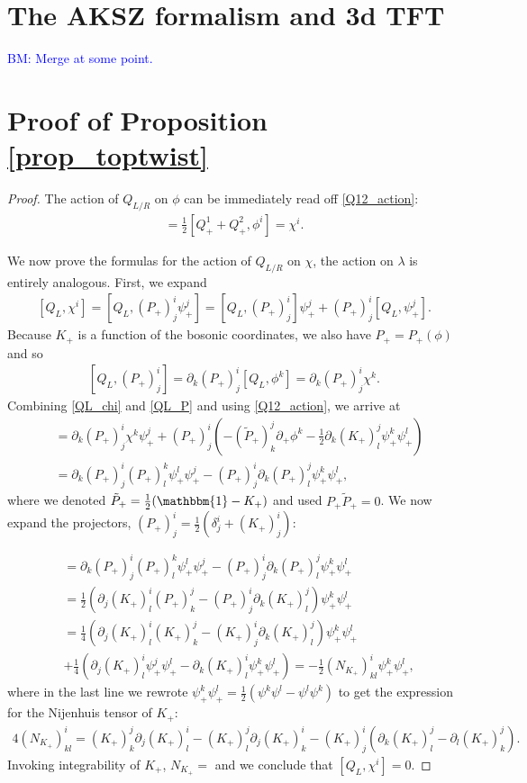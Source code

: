 \documentclass{article}
\newcommand{\id}{\mathbbm{1}}
\newcommand{\p}{\partial}
\def\tl{\tilde}
\theoremstyle{definition}
\theoremstyle{remark}
\def\brian{\textcolor{blue}{BM: }\textcolor{blue}}
\begin{document}
\section{The AKSZ formalism and 3d TFT}

\brian{Merge at some point.}

\appendix
\section{Proof of Proposition \ref{prop_toptwist}}\label{appendix:proof_prop}
\begin{proof}
The action of $Q_{L/R}$ on $\phi$ can be immediately read off \eqref{Q12_action}:
\begin{align}
[Q_L,\phi^i]=\frac{1}{2}[Q_+^1+Q^2_+,\phi^i]=\chi^i.
\end{align}

We now prove the formulas for the action of $Q_{L/R}$ on $\chi$, the action on $\lambda$ is entirely analogous. First, we expand
\begin{align}\label{QL_chi}
[Q_L,\chi^i]=[Q_L,(P_+)^i_j\psi_+^j]=[Q_L,(P_+)^i_j]\psi_+^j{+}(P_+)^i_j[Q_L,\psi_+^j].
\end{align}
Because $K_+$ is a function of the bosonic coordinates, we also have $P_+=P_+(\phi)$ and so
\begin{align}\label{QL_P}
[Q_L,(P_+)^i_j]=\p_k(P_+)^i_j[Q_L,\phi^k]=\p_k(P_+)^i_j\chi^k.
\end{align}
Combining \eqref{QL_chi} and \eqref{QL_P} and using \eqref{Q12_action}, we arrive at
\begin{align*}
[Q_L,\chi^i]&=\p_k(P_+)^i_j\chi^k\psi_+^j{+}(P_+)^i_j\left(-(\tl{P}_+)^j_k\p_+\phi^k{-}\frac{1}{2}\p_k(K_+)^j_l\psi_+^k\psi_+^l\right)\\
&=\p_k(P_+)^i_j(P_+)^k_l\psi_+^l\psi_+^j{-}(P_+)^i_j\p_k(P_+)^j_l\psi_+^k\psi_+^l,
\end{align*}
where we denoted $\tl{P}_+=\frac{1}{2}(\id-K_+)$ and used $P_+\tl{P}_+=0$. We now expand the projectors, $(P_+)^i_j=\frac{1}{2}(\delta^i_j+(K_+)^i_j)$:

\begin{align*}
[Q_L,\chi^i]&=\p_k(P_+)^i_j(P_+)^k_l\psi_+^l\psi_+^j{-}(P_+)^i_j\p_k(P_+)^j_l\psi_+^k\psi_+^l\\
&=\frac{1}{2}(\p_j(K_+)^i_l(P_+)^j_k{-}(P_+)^i_j\p_k(K_+)^j_l)\psi_+^k\psi_+^l\\
&=\frac{1}{4}(\p_j(K_+)^i_l(K_+)^j_k{-}(K_+)^i_j\p_k(K_+)^j_l)\psi_+^k\psi_+^l\\
&+\frac{1}{4}(\p_j(K_+)^i_l\psi_+^j\psi_+^l{-}\p_k(K_+)^i_l\psi_+^k\psi_+^l)=-\frac{1}{2}(N_{K_+})^i_{kl}\psi_+^k\psi^l_+,
\end{align*}
where in the last line we rewrote $\psi_+^k\psi^l_+=\frac{1}{2}(\psi^k\psi^l-\psi^l\psi^k)$ to get the expression for the Nijenhuis tensor of $K_+$:
\begin{align*}
4(N_{K_+})^i_{kl}=(K_+)^j_k\p_j(K_+)^i_l-(K_+)^j_l\p_j(K_+)^i_k {-} (K_+)^i_j(\p_k(K_+)^j_l-\p_l(K_+)^j_k).
\end{align*}
Invoking integrability of $K_+$, $N_{K_+}=$ and we conclude that $[Q_L,\chi^i]=0$.


\end{proof}
\end{document}
